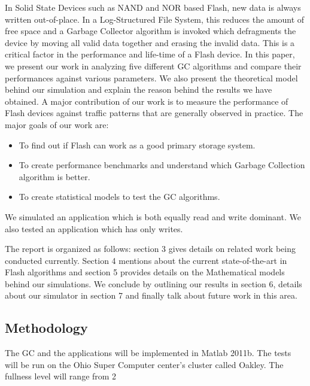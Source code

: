 In Solid State Devices such as NAND and NOR based Flash, new data is always written out-of-place. In a Log-Structured File System, this reduces the amount of free space and a Garbage Collector algorithm is invoked which defragments the device by moving all valid data together and erasing the invalid data. This is a critical factor in the performance and life-time of a Flash device. In this paper, we present our work in analyzing five different GC algorithms and compare their performances against various parameters. We also present the theoretical model behind our simulation and explain the reason behind the results we have obtained. A major contribution of our work is to measure the performance of Flash devices against traffic patterns that are generally observed in practice.
The major goals of our work are:
\begin{itemize}
\item To find out if Flash can work as a good primary storage system. 
\item To create performance benchmarks and understand which Garbage Collection algorithm is better. 
\item To create statistical models to test the GC algorithms.
\end{itemize}

We simulated an application which is both equally read and write dominant. We also tested an application which has only writes.

The report is organized as follows: section 3 gives details on related work being conducted currently. Section 4 mentions about the current state-of-the-art in Flash algorithms and section 5 provides details on the Mathematical models behind our simulations. We conclude by outlining our results in section 6, details about our simulator in section 7 and finally talk about future work in this area.

\subsection{Methodology}
The GC and the applications will be implemented in Matlab 2011b. The tests will be run on the Ohio Super Computer center’s cluster called Oakley. The fullness level will range from 2%

